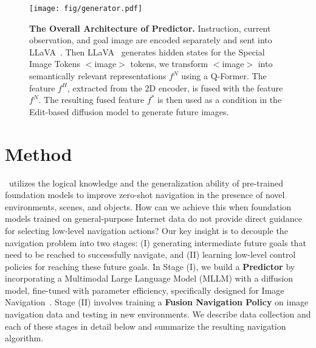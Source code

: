 \begin{figure*}[ht]
    \centering
    \texttt{[image: fig/generator.pdf]}
    \caption{\textbf{The Overall Architecture of Predictor.} Instruction, current observation, and goal image are encoded separately and sent into LLaVA~\cite{liu2024visual}. Then LLaVA~\cite{liu2024visual} generates hidden states for the Special Image Tokens $<$image$>$ tokens, we transform $<$image$>$ into semantically relevant representations $f^N$ using a Q-Former. The feature $f^H$, extracted from the 2D encoder, is fused with the feature $f^N$. The resulting fused feature $f^*$ is then used as a condition in the Edit-based diffusion model to generate future images.}
    \label{fig:generator}
\end{figure*}

\section{Method}





\mname ~utilizes the logical knowledge and the generalization ability of pre-trained foundation models to improve zero-shot navigation in the presence of novel environments, scenes, and objects. 
%
How can we achieve this when foundation models trained on general-purpose Internet data do not provide direct guidance for selecting low-level navigation actions? 
%
Our key insight is to decouple the navigation problem into two stages: (I) generating intermediate future goals that need to be reached to successfully navigate, and (II) learning low-level control policies for reaching these future goals. 
%
In Stage (I), we build a \textbf{Predictor} by incorporating a Multimodal Large Language Model (MLLM) with a diffusion model, fine-tuned with parameter efficiency, specifically designed for Image Navigation~\cite{zhu2017target}. 
%
Stage (II) involves training a \textbf{Fusion Navigation Policy} on image navigation data and testing in new environments. We describe data collection and each of these stages in detail below and summarize the resulting navigation algorithm.

